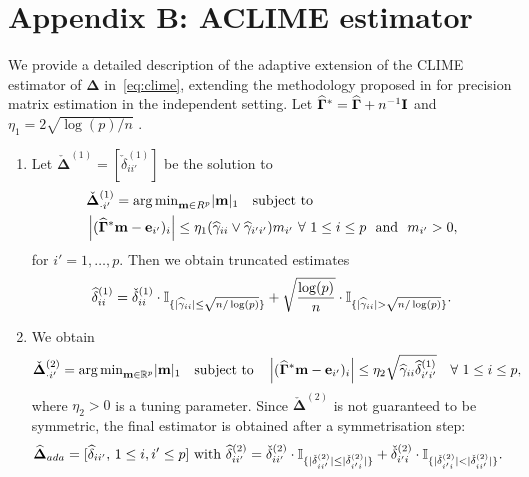 \section{Appendix B: ACLIME estimator}
\label{sec:aclime}

We provide a detailed description of the adaptive extension of the CLIME estimator of $\bm\Delta$ in~\eqref{eq:clime}, extending the methodology proposed in \cite{cai2016estimating} for precision matrix estimation in the independent setting.
Let $\widehat{\bm\Gamma}^* = \widehat{\bm\Gamma} + n^{-1}{\mathbf I}$ and $\eta_1 = 2 \sqrt{{\log (p)} / {n}}$ .

\begin{enumerate}[label = Step~\arabic*:]
\setlength\itemsep{0em}
\item Let $\check{\bm\Delta}^{(1)} = [\check{\delta}_{ii'}^{(1)}]$ be the solution to
\begin{align}
\label{eq:adap:step1}
& \check{\bm\Delta}^{(1)}_{\cdot i'}  = {\arg\min}_{\mathbf m \in R^p} \vert \mathbf m \vert_1 
\quad \text{subject to} 
\\
& \left\vert ( \widehat{\bm\Gamma}^* \mathbf m - \mathbf e_{i'})_i \right\vert \le \eta_1 (\widehat{\gamma}_{ii} \vee \widehat{\gamma}_{i'i'})  m_{i'} \ \forall \ 1 \le i \le p \text{ \ and \ }  m_{i'} > 0, \nonumber
\end{align}
for $i' = 1, \ldots, p$. 
Then we obtain truncated estimates 
\begin{align*}
	\widehat{\delta}_{ii}^{(1)} = \check{\delta}_{ii}^{(1)} \cdot  \mathbb{I}_{\{\vert \widehat{\gamma}_{ii} \vert \le \sqrt{n/\log(p)} \}} + 
	 \sqrt{\frac{\log(p)}{n}} \cdot \mathbb{I}_{\{\vert \widehat{\gamma}_{ii} \vert > \sqrt{n/\log(p)} \}}.
\end{align*}

\item We obtain 
\begin{align*}
\check{\bm\Delta}^{(2)}_{\cdot i'} & = {\arg\min}_{\mathbf m \in \mathbb{R}^p } \vert \mathbf m \vert_1 
\quad \text{subject to} \quad 
\left\vert ( \widehat{\bm\Gamma}^* \mathbf m - \mathbf e_{i'})_i \right\vert \le \eta_2 \sqrt{\widehat{\gamma}_{ii} \widehat{\delta}_{i'i'}^{(1)} } \quad \forall \ 1 \le i \le p,
\end{align*}
where $\eta_2 > 0$ is a tuning parameter.
Since $\check{\bm\Delta}^{(2)}$ is not guaranteed to be symmetric, 
the final estimator is obtained after a symmetrisation step:
\begin{align}
\label{eq:delta:aclime}
\widehat{\bm\Delta}_{ada} &= [\widehat\delta_{ii'}, \, 1 \le i, i' \le p]
\text{ with } 
\widehat\delta_{ii'}^{(2)} = \check\delta_{ii'}^{(2)} \cdot \mathbb{I}_{\{\vert \check\delta_{ii'}^{(2)} \vert
\le \vert \check\delta_{i'i}^{(2)} \vert \}}
+ \check\delta_{i'i}^{(2)} \cdot \mathbb{I}_{\{\vert \check\delta_{i'i}^{(2)} \vert
< \vert \check\delta_{ii'}^{(2)} \vert \}}.
\end{align}
\end{enumerate}

